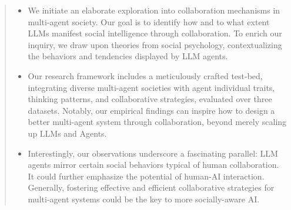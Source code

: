 \documentclass[11pt]{article}
\newcommand{\customcomment}[3]{\textcolor{#1}{[#2:#3]}}
\newcommand{\bh}[1]{\customcomment{blue}{BH}{#1}}
\begin{document}
\begin{abstract}
\begin{itemize}
\item We initiate an elaborate exploration into collaboration mechanisms in multi-agent society. Our goal is to identify how and to what extent LLMs manifest social intelligence through collaboration. To enrich our inquiry, we draw upon theories from social psychology, contextualizing the behaviors and tendencies displayed by LLM agents. 

\item Our research framework includes a meticulously crafted test-bed, integrating diverse multi-agent societies with agent individual traits, thinking patterns, and collaborative strategies, evaluated over three datasets. Notably, our empirical findings can inspire how to design a better multi-agent system through collaboration, beyond merely scaling up LLMs and Agents. 

\item Interestingly, our observations underscore a fascinating parallel: LLM agents mirror certain social behaviors typical of human collaboration. It could further emphasize the potential of human-AI interaction. Generally, fostering effective and efficient collaborative strategies for multi-agent systems could be the key to more socially-aware AI. 
\end{itemize}

\end{abstract}
\end{document}
